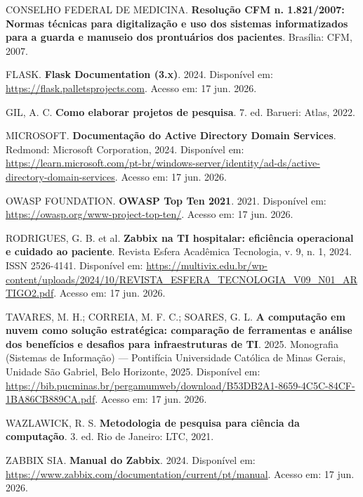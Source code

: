 \documentclass[12pt,a4paper,oneside]{report}
\begin{document}
\vspace{0.2cm}

CONSELHO FEDERAL DE MEDICINA. \textbf{Resolução CFM n. 1.821/2007: Normas técnicas para digitalização e uso dos sistemas informatizados para a guarda e manuseio dos prontuários dos pacientes}. Brasília: CFM, 2007.

\vspace{0.2cm}

FLASK. \textbf{Flask Documentation (3.x)}. 2024. Disponível em: \url{https://flask.palletsprojects.com}. Acesso em: 17 jun. 2026.

\vspace{0.2cm}

GIL, A. C. \textbf{Como elaborar projetos de pesquisa}. 7. ed. Barueri: Atlas, 2022.

\vspace{0.2cm}

MICROSOFT. \textbf{Documentação do Active Directory Domain Services}. Redmond: Microsoft Corporation, 2024. Disponível em: \url{https://learn.microsoft.com/pt-br/windows-server/identity/ad-ds/active-directory-domain-services}. Acesso em: 17 jun. 2026.

\vspace{0.2cm}

OWASP FOUNDATION. \textbf{OWASP Top Ten 2021}. 2021. Disponível em: \url{https://owasp.org/www-project-top-ten/}. Acesso em: 17 jun. 2026.

\vspace{0.2cm}

RODRIGUES, G. B. et al. \textbf{Zabbix na TI hospitalar: eficiência operacional e cuidado ao paciente}. Revista Esfera Acadêmica Tecnologia, v. 9, n. 1, 2024. ISSN 2526-4141. Disponível em: \url{https://multivix.edu.br/wp-content/uploads/2024/10/REVISTA_ESFERA_TECNOLOGIA_V09_N01_ARTIGO2.pdf}. Acesso em: 17 jun. 2026.

\vspace{0.2cm}

TAVARES, M. H.; CORREIA, M. F. C.; SOARES, G. L. \textbf{A computação em nuvem como solução estratégica: comparação de ferramentas e análise dos benefícios e desafios para infraestruturas de TI}. 2025. Monografia (Sistemas de Informação) --- Pontifícia Universidade Católica de Minas Gerais, Unidade São Gabriel, Belo Horizonte, 2025. Disponível em: \url{https://bib.pucminas.br/pergamumweb/download/B53DB2A1-8659-4C5C-84CF-1BA86CB889CA.pdf}. Acesso em: 17 jun. 2026.

\vspace{0.2cm}

WAZLAWICK, R. S. \textbf{Metodologia de pesquisa para ciência da computação}. 3. ed. Rio de Janeiro: LTC, 2021.

\vspace{0.2cm}

ZABBIX SIA. \textbf{Manual do Zabbix}. 2024. Disponível em: \url{https://www.zabbix.com/documentation/current/pt/manual}. Acesso em: 17 jun. 2026.




\end{document}

